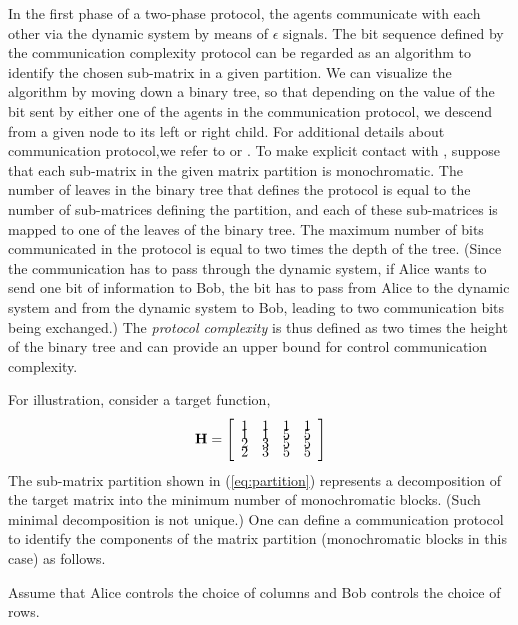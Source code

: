 \documentclass[12pt,onecolumn,draftcls]{IEEEtran}
\begin{document}
In the first phase of a two-phase protocol, the agents communicate with each other via the dynamic system
by means of $\epsilon$ signals.  The bit sequence defined by the communication complexity
protocol can be regarded as an algorithm to identify the chosen sub-matrix in a given
partition.  We can visualize the algorithm by moving down a binary tree,
so that depending on the value of the bit sent by either one of the agents in the
communication protocol, we descend from a given node to its left or right child.   For additional details about communication protocol,we refer to \cite{KN} or \cite{Wong}.  To make explicit contact with \cite{KN}, suppose that each sub-matrix in the given matrix partition is monochromatic.  The number of leaves in the binary tree that defines the protocol is equal to the number of sub-matrices defining the partition, and each of these sub-matrices is mapped to one of the leaves of the binary tree.  The maximum number of bits communicated in the protocol is equal to two times the depth of the tree.   (Since the communication has to pass through the dynamic system, if Alice wants to send one bit of information to Bob, the bit has to pass from Alice to the dynamic system and from the dynamic system to Bob, leading to two communication bits being exchanged.)  The {\em protocol complexity} is thus defined as two times the height of the binary tree and can provide an upper bound for control communication complexity. 

For illustration, consider a target function,
\begin{equation}
\bf{H} = \left[
\begin{array}{cccc}
1 & 1 & 1 & 1 \vspace{-.2cm}\\
1 & 1 & 5 & 5 \vspace{-.2cm}\\
2 & 3 & 5 & 5 \vspace{-.2cm}\\
2 & 3 & 5 & 5 \\ 
\end{array}\right]
\label{eq:jb:target}
\end{equation}
The sub-matrix partition shown in (\ref{eq:partition}) represents a decomposition of the target matrix
into the minimum number of monochromatic blocks.  (Such minimal decomposition is not unique.)
One can define a communication protocol to identify the components of the matrix partition (monochromatic blocks in this case) as follows.  

\bigskip
{} Assume that Alice controls the choice of columns and Bob controls
the choice of rows.
\end{document}
